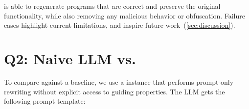 \documentclass[a4paper,twoside,12pt]{report} %
\begin{document}
\sys is able to regenerate programs that are correct and preserve the original functionality,
while also removing any malicious behavior or obfuscation.
Failure cases highlight current limitations, and inspire future work~(\cref{sec:discussion}).

\section{Q2: Naive LLM vs. \sys}

To compare \sys against a baseline, we use a \gptmodel instance
that performs prompt-only rewriting without explicit access to guiding properties.
The LLM gets the following prompt template:

\end{document}
